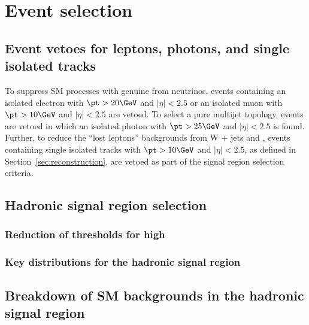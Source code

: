 \section{Event selection}
\label{sec:selection}

\subsection{Event vetoes for leptons, photons, and single isolated tracks\label{sec:vetoes}}

To suppress SM processes with genuine \met from neutrinos, events
containing an isolated electron with $\pt > 20\GeV$ and $|\eta| < 2.5$ or an isolated muon
with $\pt > 10\GeV$ and $|\eta| < 2.5$ are vetoed. To select a pure
multijet topology, events are vetoed in which an isolated
photon with $\pt > 25\GeV$ and $|\eta| < 2.5$ is
found.  Further, to reduce the ``lost leptons'' backgrounds from W +
jets and \ttbar, events containing single isolated tracks with $\pt >
10\GeV$ and $|\eta| < 2.5$, as defined in
Section~\ref{sec:reconstruction}, are vetoed as part of the signal
region selection criteria. 

\subsection{Hadronic signal region selection}


\subsubsection{Reduction of \alphat thresholds for high \HT}


\subsubsection{Key distributions for the hadronic signal
  region\label{sec:mc-data-comp}}

\subsection{Breakdown of SM backgrounds in the hadronic signal
  region\label{sec:bkgd-comp}}

